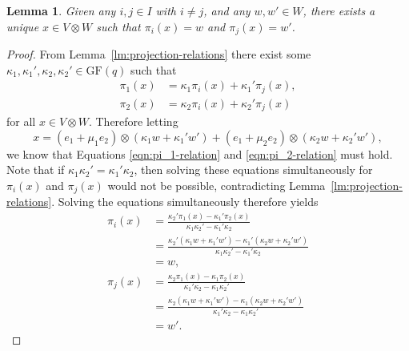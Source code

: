 \documentclass[10pt]{amsart}
\theoremstyle{definition}
\theoremstyle{plain}
\newtheorem{lemma}[lemma]{Lemma}
\theoremstyle{plain}
\theoremstyle{plain}
\theoremstyle{plain}
\newcommand{\GF}{\mathrm{GF}}
\begin{document}
\begin{lemma} \label{lm:two-projections-determines-tensor}
Given any $i, j \in I$ with $i \neq j$, and any $w, w' \in W$, there exists a unique $x \in V \otimes W$ such that $\pi_i{\left(x \right)} = w$ and $\pi_j{\left(x \right)} = w'$.
\end{lemma}
\begin{proof}
From Lemma~\ref{lm:projection-relations} there exist some $\kappa_1, \kappa_1', \kappa_2, \kappa_2' \in \GF{\left(q \right)}$ such that
\begin{align}
    \pi_1{\left(x \right)} &= \kappa_1 \pi_i{\left(x \right)} + \kappa_1' \pi_j{\left(x \right)}, \label{eqn:pi_1-relation} \\
    \pi_2{\left(x \right)} &= \kappa_2 \pi_i{\left(x \right)} + \kappa_2' \pi_j{\left(x \right)} \label{eqn:pi_2-relation}
\end{align}
for all $x \in V \otimes W$. Therefore letting
\begin{displaymath}
    x = \left(e_1 + \mu_1 e_2 \right) \otimes \left(\kappa_1 w + \kappa_1' w' \right) + \left(e_1 + \mu_2 e_2 \right) \otimes {\left(\kappa_2 w + \kappa_2' w' \right)},
\end{displaymath}
we know that Equations \eqref{eqn:pi_1-relation} and \eqref{eqn:pi_2-relation} must hold. Note that if $\kappa_1 \kappa_2' = \kappa_1' \kappa_2$, then solving these equations simultaneously for $\pi_i{\left(x \right)}$ and $\pi_j{\left(x \right)}$ would not be possible, contradicting Lemma~\ref{lm:projection-relations}. Solving the equations simultaneously therefore yields
\begin{align*}
    \pi_i{\left(x \right)} &= \frac{\kappa_2' \pi_1{\left(x \right)} - \kappa_1' \pi_2{\left(x \right)}}{\kappa_1 \kappa_2' - \kappa_1' \kappa_2} \\
    &= \frac{\kappa_2' \left(\kappa_1 w + \kappa_1' w' \right) - \kappa_1' \left(\kappa_2 w + \kappa_2' w' \right)}{\kappa_1 \kappa_2' - \kappa_1' \kappa_2} \\
    &= w, \\
    \pi_j{\left(x \right)} &= \frac{\kappa_2 \pi_1{\left(x \right)} - \kappa_1 \pi_2{\left(x \right)}}{\kappa_1' \kappa_2 - \kappa_1 \kappa_2'} \\
    &= \frac{\kappa_2 \left(\kappa_1 w + \kappa_1' w' \right) - \kappa_1 \left(\kappa_2 w + \kappa_2' w' \right)}{\kappa_1' \kappa_2 - \kappa_1 \kappa_2'} \\
    &= w'.
\end{align*}


\end{proof}
\end{document}
